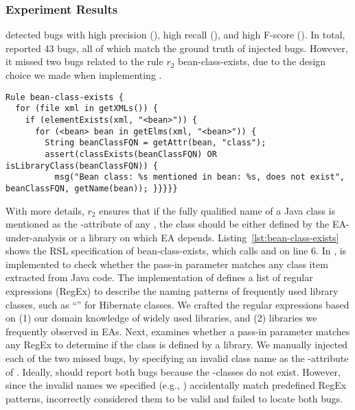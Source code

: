 \subsubsection{Experiment Results} \label{sss:bug-detect}
\tool detected bugs with high precision (\precision), high recall (\recall), and high F-score (\fscore). In total, \tool reported 43 bugs, all of which match the ground truth of injected bugs. However, it missed two bugs related to the rule $r_2$ bean-class-exists, due to the design choice we made when implementing \tool.

  \vspace{-.5em}
\begin{lstlisting}[label={lst:bean-class-exists},caption=The RSL rule of bean-class-exists]
Rule bean-class-exists {
  for (file xml in getXMLs()) {
    if (elementExists(xml, "<bean>")) {
      for (<bean> bean in getElms(xml, "<bean>")) {
        String beanClassFQN = getAttr(bean, "class");
        assert(classExists(beanClassFQN) OR isLibraryClass(beanClassFQN)) {
          msg("Bean class: %s mentioned in bean: %s, does not exist", beanClassFQN, getName(bean)); }}}}}  
\end{lstlisting}

With more details, $r_2$ ensures that if the fully qualified name of a Java class is mentioned as the -attribute of any , the class should be either defined by the 
EA-under-analysis or a library on which EA depends. Listing~\ref{lst:bean-class-exists} shows the RSL specification of bean-class-exists, which calls  and  on line 6. 
In \tool,  is implemented to check whether the pass-in parameter matches any class item extracted from Java code.
The implementation of  defines a list of regular expressions (RegEx) to describe the naming patterns of frequently used library classes, such as ``'' for Hibernate classes. We crafted the regular expressions based on (1) our domain knowledge of widely used libraries, and (2) libraries we frequently observed in EAs.
Next,  
 examines whether a pass-in parameter matches any RegEx to determine if the class is defined by a library. 
We manually injected each of the two missed bugs, by specifying an invalid class name as the -attribute of . Ideally, \tool should report both bugs because the -classes do not exist. However, since the invalid names we specified (e.g., ) accidentally match predefined RegEx patterns, \tool incorrectly considered them to be valid and failed to locate both bugs.

